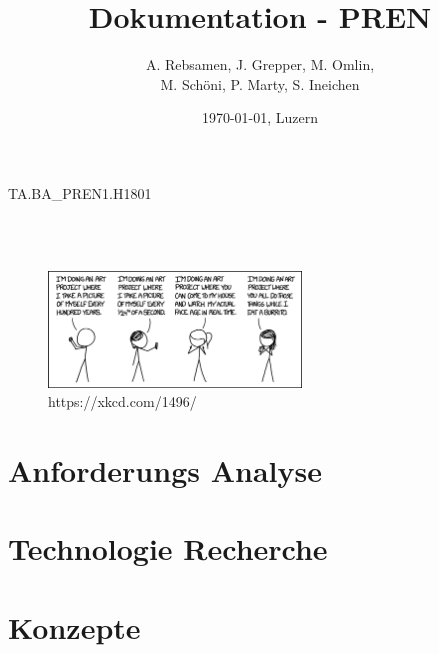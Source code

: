 \documentclass[11pt]{scrartcl}
\title{Dokumentation - PREN}
\author{A. Rebsamen, J. Grepper, M. Omlin, \\ M. Schöni, P. Marty, S. Ineichen}
\date{\today{}, Luzern}
\begin{document}
        \begin{titlingpage}
            \begin{center}
                \begin{Huge} %
                    TA.BA{\_}PREN1.H1801 \\
                    \textbf{\thetitle} \\
                \end{Huge}
                \vspace{0.5cm}
                \begin{huge} %
                    \theauthor \\
                \end{huge}
                \vspace{0.5cm}
                \vspace{1cm}
                \begin{figure}[H] %
                    \centering
                    \includegraphics[width=0.6\textwidth]{images/comic.png}
                    \caption {https://xkcd.com/1496/}
                \end{figure}
                \vspace{0.5cm}
                \begin{huge} %
                    \thedate
                \end{huge}
            \end{center}
        \end{titlingpage}

        \tableofcontents
        \clearpage

        \section{Anforderungs Analyse}
        
        \clearpage

        \section{Technologie Recherche}
        
        \clearpage

        \section{Konzepte}
        
        \clearpage

    
\end{document}
